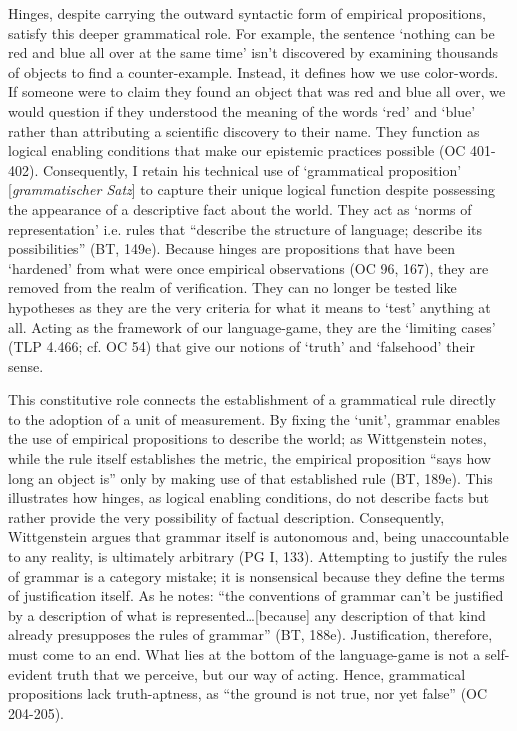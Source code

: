 Hinges, despite carrying the outward syntactic form of empirical
propositions, satisfy this deeper grammatical role. For example, the
sentence `nothing can be red and blue all over at the same time' isn't
discovered by examining thousands of objects to find a counter-example.
Instead, it defines how we use color-words. If someone were to claim
they found an object that was red and blue all over, we would question
if they understood the meaning of the words `red' and `blue' rather than
attributing a scientific discovery to their name. They function as
logical enabling conditions that make our epistemic practices possible
(OC 401-402). Consequently, I retain his technical use of `grammatical
proposition' {[}\emph{grammatischer Satz}{]} to capture their unique
logical function despite possessing the appearance of a descriptive fact
about the world. They act as `norms of representation' i.e. rules that
``describe the structure of language; describe its possibilities'' (BT,
149e). Because hinges are propositions that have been `hardened' from
what were once empirical observations (OC 96, 167), they are removed
from the realm of verification. They can no longer be tested like
hypotheses as they are the very criteria for what it means to `test'
anything at all. Acting as the framework of our language-game, they are
the `limiting cases' (TLP 4.466; cf. OC 54) that give our notions of
`truth' and `falsehood' their sense.

This constitutive role connects the establishment of a grammatical rule
directly to the adoption of a unit of measurement. By fixing the `unit',
grammar enables the use of empirical propositions to describe the world;
as Wittgenstein notes, while the rule itself establishes the metric, the
empirical proposition ``says how long an object is'' only by making use
of that established rule (BT, 189e). This illustrates how hinges, as
logical enabling conditions, do not describe facts but rather provide
the very possibility of factual description. Consequently, Wittgenstein
argues that grammar itself is autonomous and, being unaccountable to any
reality, is ultimately arbitrary (PG I, 133). Attempting to justify the
rules of grammar is a category mistake; it is nonsensical because they
define the terms of justification itself. As he notes: ``the conventions
of grammar can't be justified by a description of what is
represented\ldots{[}because{]} any description of that kind already
presupposes the rules of grammar'' (BT, 188e). Justification, therefore,
must come to an end. What lies at the bottom of the language-game is not
a self-evident truth that we perceive, but our way of acting. Hence,
grammatical propositions lack truth-aptness, as ``the ground is not
true, nor yet false'' (OC 204-205).

